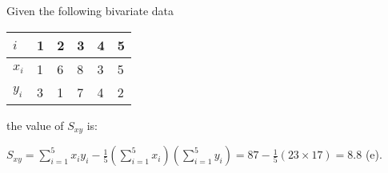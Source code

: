 \documentclass[bigtut]{tutorial}
\begin{document}
\begin{tutorial}
\begin{questions}
\begin{solution}
\end{solution}




 \question
Given the following bivariate data
 \begin{center}
                                                    \begin{tabular}{|l|lllll|}
                                                    \hline
                                                            $i$&1&2&3&4&5\\
                                                            \hline
                                                            $x_i$&1&6&8&3&5\\
                                                            \hline
                                                           $ y_i$&3&1&7&4&2\\
                                                   \hline
                                                    \end{tabular}
                                            \end{center}
the value of $S_{xy} $ is:
   
             


               
 \begin{solution}

$S_{xy} =  \sum_{i=1}^{5} x_i y_i - \frac{1}{5} \left( \sum_{i=1}^{5} x_i \right) \left( \sum_{i=1}^{5} y_i \right) 
=  87 -  \frac{1}{5} (23 \times 17) = 8.8$ (e).
                            \end{solution}
   

\end{questions}
\end{tutorial}
\end{document}
